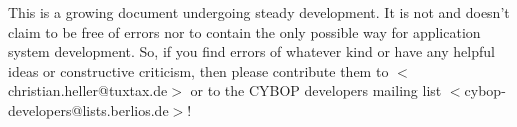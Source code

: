 This is a growing document undergoing steady development. It is not and doesn't
claim to be free of errors nor to contain the only possible way for application
system development. So, if you find errors of whatever kind or have any helpful
ideas or constructive criticism, then please contribute them to
\(<\)christian.heller@tuxtax.de\(>\) or to the CYBOP developers mailing list
\(<\)cybop-developers@lists.berlios.de\(>\)!
